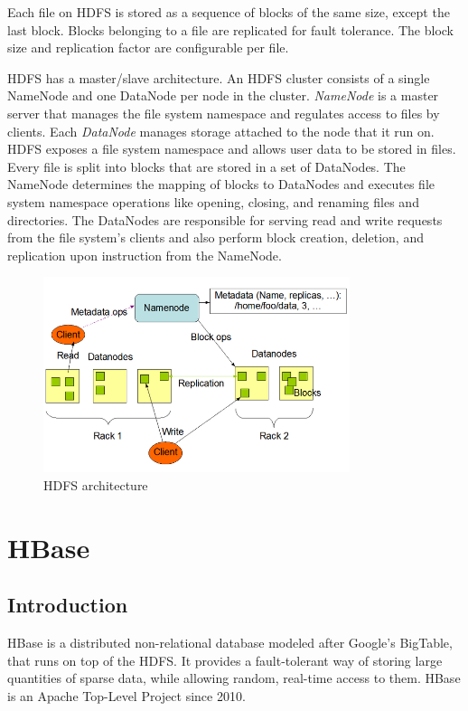 Each file on HDFS is stored as a sequence of blocks of the same size, except the last block. Blocks belonging to a file are replicated for fault tolerance. The block size and replication factor are configurable per file.

HDFS has a master/slave architecture. An HDFS cluster consists of a single NameNode and one DataNode per node in the cluster. \emph{NameNode} is a master server that manages the file system namespace and regulates access to files by clients. Each \emph{DataNode} manages storage attached to the node that it run on. HDFS exposes a file system namespace and allows user data to be stored in files. Every file is split into blocks that are stored in a set of DataNodes. The NameNode determines the mapping of blocks to DataNodes and executes file system namespace operations like opening, closing, and renaming files and directories. The DataNodes are responsible for serving read and write requests from the file system’s clients and also perform block creation, deletion, and replication upon instruction from the NameNode.

\begin{figure}[H]
\centering
\includegraphics[width=0.8\textwidth]{figures/hdfs_architecture}
\caption{HDFS architecture}
\label{figure:hdfs_architecture}
\end{figure}


\section{HBase}

\subsection{Introduction}

HBase is a distributed non-relational database modeled after Google's BigTable, that runs on top of the HDFS. It provides a fault-tolerant way of storing large quantities of sparse data, while allowing random, real-time access to them. HBase is an Apache Top-Level Project since 2010.

